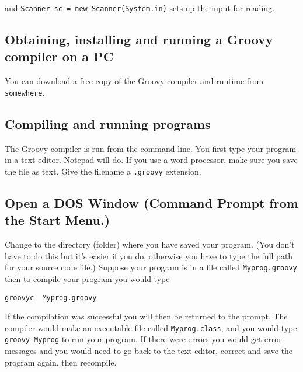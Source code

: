 \noindent and
\verb+Scanner sc = new Scanner(System.in)+  sets up the input for reading.

\subsection{Obtaining, installing and running a Groovy compiler on a PC}

You can download a free copy of the Groovy compiler and runtime from \texttt{somewhere}.

\subsection{Compiling and running programs}

The Groovy compiler is run from the command line.
You first type your program in a text editor. Notepad will do. If you use a word-processor, make sure you save the file as text. 
Give the filename a \texttt{.groovy} extension.

\subsection*{Open a DOS Window (Command Prompt from the Start Menu.)}

Change to the directory (folder) where you have saved your program. 
(You don't have to do this but it's easier if you do, otherwise you have to type the full path for your source code file.)  Suppose your program is in a file called
\texttt{Myprog.groovy} then to compile your program you would type
\begin{Verbatim}
groovyc  Myprog.groovy
\end{Verbatim}
If the compilation was successful you will then be returned to the prompt. 
The compiler would make an executable file called \texttt{Myprog.class}, and you would type \texttt{groovy Myprog} to run your program.
If there were errors you would get error messages and you would need to go back to the text editor, correct and save the program again, then recompile.
